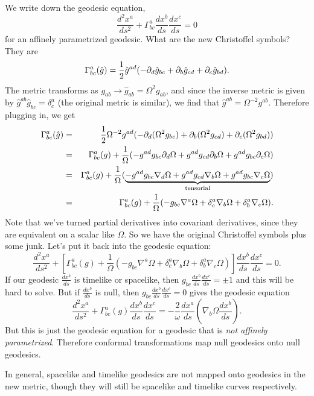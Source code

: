 We write down the geodesic equation,
$$\frac{d^2x^a}{ds^2}+\Gamma^a_{bc} \frac{dx^b}{ds}\frac{dx^c}{ds}=0$$ for an affinely parametrized geodesic. What are the new Christoffel symbols? They are
$$\Gamma^a_{bc}(\hat g)=\frac{1}{2} \hat g^{ad}(-\partial_d \hat g_{bc}+\partial_b \hat g_{cd}+\partial_c \hat g_{bd}).$$
The metric transforms as $g_{ab}\to \hat g_{ab}=\Omega^2 g_{ab}$, and since the inverse metric is given by $\hat g^{ab}\hat g_{bc}=\delta^a_c$ (the original metric is similar), we find that $\hat g^{ab}=\Omega^{-2} g^{ab}.$ Therefore plugging in, we get
\begin{eqnarray*}
\Gamma^a_{bc}(\hat g)&=&\frac{1}{2} \Omega^{-2} g^{ad}(-\partial_d(\Omega^2 g_{bc})+\partial_b(\Omega^2 g_{cd})+\partial_c(\Omega^2 g_{bd}))\\
&=&\Gamma^a_{bc}(g)+\frac{1}{\Omega}(-g^{ad}g_{bc} \partial_d \Omega + g^{ad}g_{cd} \partial_b \Omega + g^{ad} g_{bc}\partial_c \Omega)\\
&=&\Gamma^a_{bc}(g)+\frac{1}{\Omega}(\underbrace{-g^{ad}g_{bc} \nabla_d \Omega + g^{ad}g_{cd} \nabla_b \Omega + g^{ad} g_{bc}\nabla_c \Omega}_{\text{tensorial}})\\
&=&\Gamma^a_{bc}(g)+\frac{1}{\Omega}(-g_{bc}\nabla^a \Omega +\delta^a_c \nabla_b \Omega +\delta^a_b \nabla_c \Omega).
\end{eqnarray*}
Note that we've turned partial derivatives into covariant derivatives, since they are equivalent on a scalar like $\Omega$. So we have the original Christoffel symbols plus some junk. Let's put it back into the geodesic equation:
$$\frac{d^2x^a}{ds^2}+\left[\Gamma^a_{bc}(g)+\frac{1}{\Omega}(-g_{bc}\nabla^a \Omega +\delta^a_c \nabla_b \Omega +\delta^a_b \nabla_c \Omega)\right]\frac{dx^b}{ds}\frac{dx^c}{ds}=0.$$
If our geodesic $\frac{dx^b}{ds}$ is timelike or spacelike, then $g_{bc}\frac{dx^b}{ds}\frac{dx^c}{ds}=\pm 1$ and this will be hard to solve. But if $\frac{dx^b}{ds}$ is null, then $g_{bc}\frac{dx^b}{ds}\frac{dx^c}{ds}=0$ gives the geodesic equation
$$\frac{d^2x^a}{ds^2}+\Gamma^a_{bc}(g)\frac{dx^b}{ds}\frac{dx^c}{ds}=-\frac{2}{\omega}\frac{dx^a}{ds}\left(\nabla_b \Omega \frac{dx^b}{ds}\right).$$
But this is just the geodesic equation for a geodesic that is \emph{not affinely parametrized}. Therefore conformal transformations map null geodesics onto null geodesics.

In general, spacelike and timelike geodesics are not mapped onto geodesics in the new metric, though they will still be spacelike and timelike curves respectively.